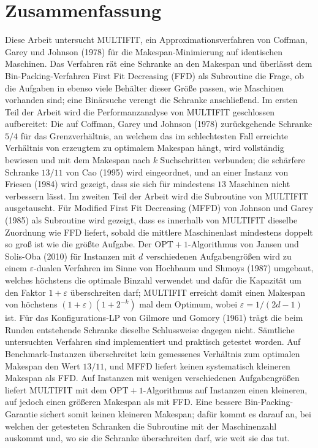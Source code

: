 \chapter*{Zusammenfassung}

Diese Arbeit untersucht MULTIFIT, ein Approximationsverfahren von Coffman, Garey und Johnson
(1978) für die Makespan-Minimierung auf identischen Maschinen.
Das Verfahren rät eine Schranke an den Makespan und überlässt dem Bin-Packing-Verfahren First
Fit Decreasing (FFD) als Subroutine die Frage, ob die Aufgaben in ebenso viele Behälter dieser
Größe passen, wie Maschinen vorhanden sind; eine Binärsuche verengt die Schranke anschließend.
Im ersten Teil der Arbeit wird die Performanzanalyse von MULTIFIT geschlossen aufbereitet: Die
auf Coffman, Garey und Johnson (1978) zurückgehende Schranke $5/4$ für das Grenzverhältnis, an
welchem das im schlechtesten Fall erreichte Verhältnis von erzeugtem zu optimalem Makespan
hängt, wird vollständig bewiesen und mit dem Makespan nach $k$ Suchschritten verbunden; die
schärfere Schranke $13/11$ von Cao (1995) wird eingeordnet, und an einer Instanz von Friesen
(1984) wird gezeigt, dass sie sich für mindestens $13$ Maschinen nicht verbessern lässt.
Im zweiten Teil der Arbeit wird die Subroutine von MULTIFIT ausgetauscht.
Für Modified First Fit Decreasing (MFFD) von Johnson und Garey (1985) als Subroutine wird
gezeigt, dass es innerhalb von MULTIFIT dieselbe Zuordnung wie FFD liefert, sobald die mittlere
Maschinenlast mindestens doppelt so groß ist wie die größte Aufgabe.
Der $\mathrm{OPT}+1$-Algorithmus von Jansen und Solis-Oba (2010) für Instanzen mit $d$
verschiedenen Aufgabengrößen wird zu einem $\varepsilon$-dualen Verfahren im Sinne von Hochbaum
und Shmoys (1987) umgebaut, welches höchstens die optimale Binzahl verwendet und dafür die
Kapazität um den Faktor $1+\varepsilon$ überschreiten darf; MULTIFIT erreicht damit einen
Makespan von höchstens $(1+\varepsilon)(1+2^{-k})$ mal dem Optimum, wobei
$\varepsilon = 1/(2d-1)$ ist.
Für das Konfigurations-LP von Gilmore und Gomory (1961) trägt die beim Runden entstehende
Schranke dieselbe Schlussweise dagegen nicht.
Sämtliche untersuchten Verfahren sind implementiert und praktisch getestet worden.
Auf \EvalInstanzen{} Benchmark-Instanzen überschreitet kein gemessenes Verhältnis zum optimalen
Makespan den Wert $13/11$, und MFFD liefert keinen systematisch kleineren Makespan als FFD.
Auf \HmInstanzen{} Instanzen mit wenigen verschiedenen Aufgabengrößen liefert MULTIFIT mit dem
$\mathrm{OPT}+1$-Algorithmus auf \HmJansenBesserFFD{} Instanzen einen kleineren, auf
\HmJansenSchlechterFFD{} jedoch einen größeren Makespan als mit FFD.
Eine bessere Bin-Packing-Garantie sichert somit keinen kleineren Makespan; dafür kommt es darauf
an, bei welchen der getesteten Schranken die Subroutine mit der Maschinenzahl auskommt und, wo
sie die Schranke überschreiten darf, wie weit sie das tut.
